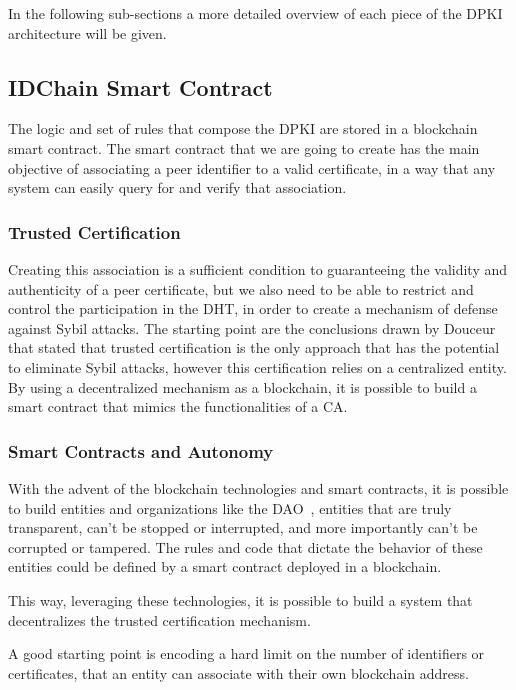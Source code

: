 In the following sub-sections a more detailed overview of each piece of the \ac{DPKI} architecture will be given.

\subsection{IDChain Smart Contract}

The logic and set of rules that compose the \ac{DPKI} are stored in a blockchain smart contract.
The smart contract that we are going to create has the main objective of associating a peer identifier to a valid certificate, in a way that any system can easily query for and verify that association.

\subsubsection{Trusted Certification}
Creating this association is a sufficient condition to guaranteeing the validity and authenticity of a peer certificate, but we also need to be able to restrict and control the participation in the \ac{DHT}, in order to create a mechanism of defense against Sybil attacks.
The starting point are the conclusions drawn by Douceur~\cite{Douceur2002} that stated that trusted certification is the only approach that has the potential to eliminate Sybil attacks, however this certification relies on a centralized entity.
By using a decentralized mechanism as a blockchain, it is possible to build a smart contract that mimics the functionalities of a \ac{CA}.

\subsubsection{Smart Contracts and Autonomy}
With the advent of the blockchain technologies and smart contracts, it is possible to build entities and organizations like the \ac{DAO}~\cite{ralphc.merkle2016}, entities that are truly transparent, can't be stopped or interrupted, and more importantly can't be corrupted or tampered.
The rules and code that dictate the behavior of these entities could be defined by a smart contract deployed in a blockchain.

This way, leveraging these technologies, it is possible to build a system that decentralizes the trusted certification mechanism.

A good starting point is encoding a hard limit on the number of identifiers or certificates, that an entity can associate with their own blockchain address.

